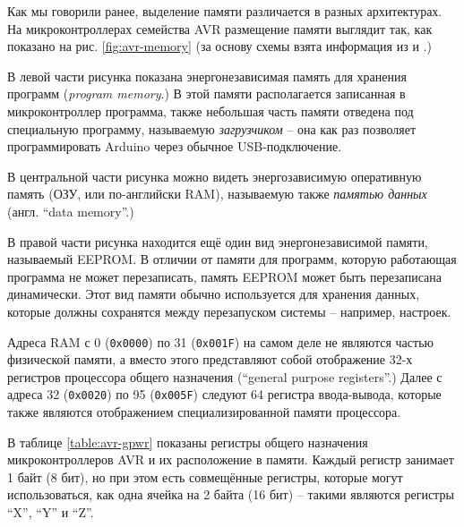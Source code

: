 \documentclass[../sparc.tex]{subfiles}
\begin{document}


Как мы говорили ранее, выделение памяти различается в разных архитектурах.  На
микроконтроллерах семейства AVR размещение памяти выглядит так, как показано на
рис. \ref{fig:avr-memory} (за основу схемы взята информация из
\cite{arduino:memory-guide} и \cite{avr:atmega328p-datasheet}.)

В левой части рисунка показана энергонезависимая память для хранения программ
(\emph{program memory}.)  В этой памяти располагается записанная в
микроконтроллер программа, также небольшая часть памяти отведена под специальную
программу, называемую \emph{загрузчиком} -- она как раз позволяет программировать
Arduino через обычное USB-подключение.

В центральной части рисунка можно видеть энергозависимую оперативную память
(\gls{ОЗУ}, или по-английски \gls{RAM}), называемую также \emph{памятью данных}
(англ. ``data memory''.)

В правой части рисунка находится ещё один вид энергонезависимой памяти,
называемый \gls{EEPROM}.  В отличии от памяти для программ, которую работающая
программа не может перезаписать, память EEPROM может быть перезаписана
динамически.  Этот вид памяти обычно используется для хранения данных, которые
должны сохранятся между перезапуском системы -- например, настроек.

Адреса \gls{RAM} с 0 (\texttt{0x0000}) по 31 (\texttt{0x001F})
на самом деле не являются частью физической памяти, а вместо этого представляют
собой отображение 32-х регистров процессора общего назначения (``general purpose
registers''.)  Далее с адреса 32 (\texttt{0x0020}) по 95
(\texttt{0x005F}) следуют 64 регистра ввода-вывода, которые также
являются отображением специализированной памяти процессора.


В таблице \ref{table:avr-gpwr} показаны регистры общего назначения
микроконтроллеров AVR и их расположение в памяти.  Каждый регистр занимает 1
байт (8 бит), но при этом есть совмещённые регистры, которые могут
использоваться, как одна ячейка на 2 байта (16 бит) -- такими являются регистры
``X'', ``Y'' и ``Z''.
\end{document}
